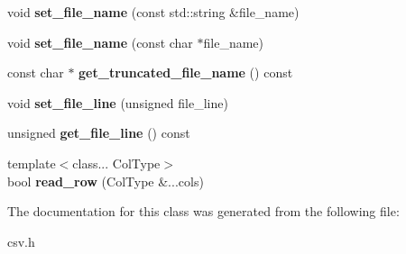 \begin{DoxyCompactItemize}
\item 
void {\bfseries set\+\_\+file\+\_\+name} (const std\+::string \&file\+\_\+name)\label{classio_1_1_c_s_v_reader_a4096c1e43a4fba2b4f5ae21d047b5fbc}

\item 
void {\bfseries set\+\_\+file\+\_\+name} (const char $\ast$file\+\_\+name)\label{classio_1_1_c_s_v_reader_a5f1dc083a8fa8661f5ecdcf6aebc7b24}

\item 
const char $\ast$ {\bfseries get\+\_\+truncated\+\_\+file\+\_\+name} () const \label{classio_1_1_c_s_v_reader_a7802939e9c108c4acfc7101baf52da95}

\item 
void {\bfseries set\+\_\+file\+\_\+line} (unsigned file\+\_\+line)\label{classio_1_1_c_s_v_reader_a1303bd6a2eb0d3d7c743212e52839ac4}

\item 
unsigned {\bfseries get\+\_\+file\+\_\+line} () const \label{classio_1_1_c_s_v_reader_aeea0f1ab9791a7dd3c699398c85edfaa}

\item 
{\footnotesize template$<$class... Col\+Type$>$ }\\bool {\bfseries read\+\_\+row} (Col\+Type \&...cols)\label{classio_1_1_c_s_v_reader_a61ecdcaa62c024bf97c4e5d133478d7e}

\end{DoxyCompactItemize}


The documentation for this class was generated from the following file\+:\begin{DoxyCompactItemize}
\item 
csv.\+h\end{DoxyCompactItemize}
